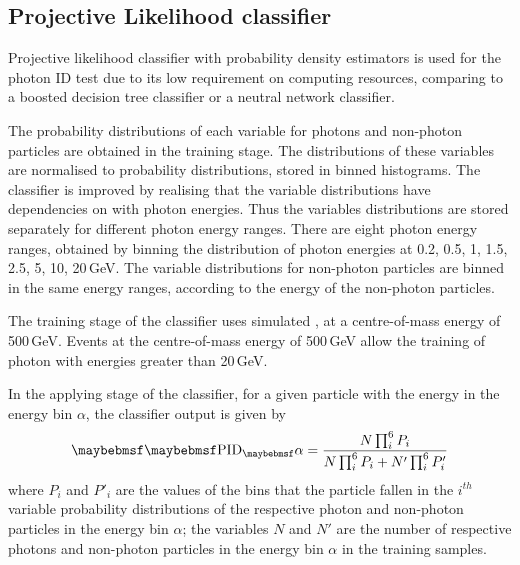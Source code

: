 
\subsection{Projective Likelihood classifier}


Projective likelihood classifier  with probability density estimators is used  for the photon ID test due to its  low requirement on computing resources, comparing to a boosted decision tree classifier or a neutral network classifier.

The probability distributions of each variable for photons and non-photon particles are obtained in the training stage. The distributions of these variables are normalised to probability distributions, stored in binned histograms. The classifier is improved by realising that the variable distributions have dependencies on with photon energies. Thus the variables distributions are stored separately for different photon energy ranges. There are eight photon energy ranges, obtained by binning the distribution of photon energies at 0.2, 0.5, 1, 1.5, 2.5, 5, 10, 20\,GeV. The variable distributions for non-photon particles are binned in the same energy ranges, according to the energy of the non-photon particles.

The training stage of the classifier uses simulated  \eeZuds, at a centre-of-mass energy of 500\,GeV. Events at the centre-of-mass energy of 500\,GeV allow the training of photon with energies greater than 20\,GeV.


In the applying stage of the classifier, for a given particle with the energy in the  energy bin $\alpha$, the classifier output is given by
\begin{equation}
\uprightMath{PID_\alpha} = \frac{N \prod_{i}^6{P_{i}}}{N \prod_{i}^6{P_{i}} + N' \prod_{i}^6{P'_{i}}}
\end{equation}
where $P_{i}$ and $P'_{i}$ are the values of the bins that the particle fallen in the $i^{th}$ variable probability distributions  of the  respective photon and non-photon particles in the energy bin $\alpha$; the variables $N$ and $N'$ are the number of respective photons and non-photon particles in the energy bin $\alpha$ in the training samples.


